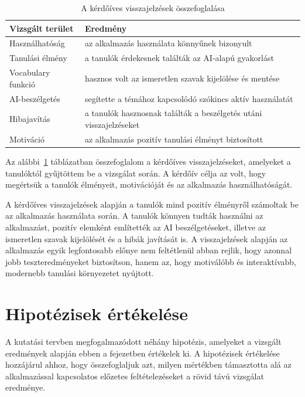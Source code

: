 \begin{table}[h!]
\centering
\begin{tabular}{p{5cm} p{9cm}}
\hline
\textbf{Vizsgált terület} & \textbf{Eredmény} \\
\hline
Használhatóság & az alkalmazás használata könnyűnek bizonyult \\
Tanulási élmény & a tanulók érdekesnek találták az AI-alapú gyakorlást \\
Vocabulary funkció & hasznos volt az ismeretlen szavak kijelölése és mentése \\
AI-beszélgetés & segítette a témához kapcsolódó szókincs aktív használatát \\
Hibajavítás & a tanulók hasznosnak találták a beszélgetés utáni visszajelzéseket \\
Motiváció & az alkalmazás pozitív tanulási élményt biztosított \\
\hline
\end{tabular}
\caption{A kérdőíves visszajelzések összefoglalása}
\label{tab:visszajelzesek}
\end{table}

Az alábbi~\ref{tab:visszajelzesek} táblázatban összefoglalom a kérdőíves visszajelzéseket, amelyeket a tanulóktól gyűjtöttem be a vizsgálat során. A kérdőív célja az volt, hogy megértsük a tanulók élményeit, motivációját és az alkalmazás használhatóságát. 

A kérdőíves visszajelzések alapján a tanulók mind pozitív élményről számoltak be az alkalmazás használata során. A tanulók könnyen tudták használni az alkalmazást, pozitív elemként említették az AI beszélgetéseket, illetve az ismeretlen szavak kijelölését és a hibák javítását is. A visszajelzések alapján az alkalmazás egyik legfontosabb előnye nem feltétlenül abban rejlik, hogy azonnal jobb teszteredményeket biztosítson, hanem az, hogy motiválóbb és interaktívabb, modernebb tanulási környezetet nyújtott.

\section{Hipotézisek értékelése}

A kutatási tervben megfogalmazódott néhány hipotézis, amelyeket a vizsgált eredmények alapján ebben a fejezetben értékelek ki. A hipotézisek értékelése hozzájárul ahhoz, hogy összefoglaljuk azt, milyen mértékben támasztotta alá az alkalmazással kapcsolatos előzetes feltételezéseket a rövid távú vizsgálat eredménye.

